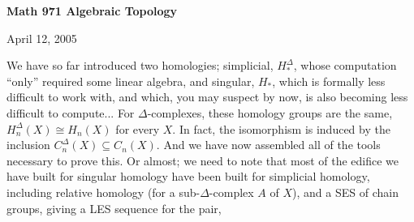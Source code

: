 \def\ccy{\Cyan}		  %
\def\cpb{\ProcessBlue}	  %
\def\csb{\SkyBlue}	  %
\def\ctu{\Turquoise}	  %
\def\ctb{\TealBlue}	  %
\def\caq{\Aquamarine}	  %
\def\cbg{\BlueGreen}	  %
\def\cem{\Emerald}	  %
\def\csg{\SeaGreen}	  %
\def\cgg{\Green}	  %
\def\cfg{\ForestGreen}	  %
\def\cpg{\PineGreen}	  %
\def\clg{\LimeGreen}	  %
\def\cyg{\YellowGreen}	  %
\def\cspg{\SpringGreen}	  %
\def\cog{\OliveGreen}	  %
\def\pars{\RawSienna}	  %
\def\cse{\Sepia}		  %
\def\cbr{\Brown}		  %
\def\cta{\Tan}		  %
\def\cgr{\Gray}		  %
\def\cbl{\Black}		  %
\def\cwh{\White}		  %


\loadmsbm



\def\ctln{\centerline}
\def\u{\underbar}
\def\ssk{\smallskip}
\def\msk{\medskip}
\def\bsk{\bigskip}
\def\hsk{\hskip.1in}
\def\hhsk{\hskip.2in}
\def\dsl{\displaystyle}
\def\hskp{\hskip1.5in}

\def\lra{$\Leftrightarrow$ }
\def\ra{\rightarrow}
\def\mpto{\logmapsto}
\def\pu{\pi_1}
\def\mpu{$\pi_1$}
\def\sig{\Sigma}
\def\msig{$\Sigma$}
\def\ep{\epsilon}
\def\sset{\subseteq}
\def\del{\partial}
\def\inv{^{-1}}
\def\wtl{\widetilde}
\def\lra{\Leftrightarrow}
\def\del{\partial}
\def\delp{\partial^\prime}
\def\delpp{\partial^{\prime\prime}}
\def\sgn{{\roman{sgn}}}
\def\wtih{\widetilde{H}}
\def\bbz{{\Bbb Z}}
\def\bbr{{\Bbb R}}



\ctln{\bf Math 971 Algebraic Topology}

\ssk

\ctln{April 12, 2005}

\msk


We have so far introduced two homologies; simplicial, $H_*^\Delta$, whose computation 
``only'' required some linear algebra,
and singular, $H_*$, which is formally less difficult to work with, and which, you may suspect by now, is also becoming
less difficult to compute... For $\Delta$-complexes, these homology groups are the same, $H_n^\Delta(X)\cong H_n(X)$
for every $X$. In fact, the isomorphism is induced by the inclusion $C_n^\Delta(X)\sset C_n(X)$. And we have
now assembled all of the tools necessary to prove this. Or almost; we need to note that most of the edifice we
have built for singular homology \u{could} have been built for simplicial homology, including relative 
homology (for a sub-$\Delta$-complex $A$ of $X$), and a SES of chain groups, giving a LES sequence for the pair,

